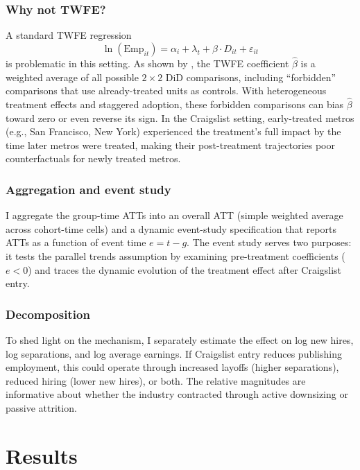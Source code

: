 \documentclass[12pt]{article}
\begin{document}
\subsubsection*{Why not TWFE?} A standard TWFE regression
\begin{equation}
\ln(\text{Emp}_{it}) = \alpha_i + \lambda_t + \beta \cdot D_{it} + \varepsilon_{it}
\end{equation}
is problematic in this setting. As shown by \citet{goodman_bacon_2021}, the TWFE coefficient $\hat{\beta}$ is a weighted average of all possible $2 \times 2$ DiD comparisons, including ``forbidden'' comparisons that use already-treated units as controls. With heterogeneous treatment effects and staggered adoption, these forbidden comparisons can bias $\hat{\beta}$ toward zero or even reverse its sign. In the Craigslist setting, early-treated metros (e.g., San Francisco, New York) experienced the treatment's full impact by the time later metros were treated, making their post-treatment trajectories poor counterfactuals for newly treated metros.

\subsubsection*{Aggregation and event study} I aggregate the group-time ATTs into an overall ATT (simple weighted average across cohort-time cells) and a dynamic event-study specification that reports ATTs as a function of event time $e = t - g$. The event study serves two purposes: it tests the parallel trends assumption by examining pre-treatment coefficients ($e < 0$) and traces the dynamic evolution of the treatment effect after Craigslist entry.

\subsubsection*{Decomposition} To shed light on the mechanism, I separately estimate the effect on log new hires, log separations, and log average earnings. If Craigslist entry reduces publishing employment, this could operate through increased layoffs (higher separations), reduced hiring (lower new hires), or both. The relative magnitudes are informative about whether the industry contracted through active downsizing or passive attrition.


\section{Results}
\end{document}
